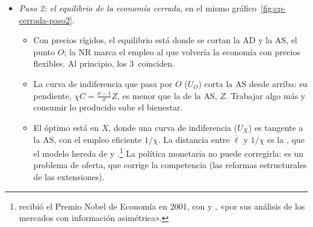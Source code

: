 \documentclass[11pt]{article}
\begin{document}
\begin{itemize}
\item \emph{Paso 2: el equilibrio de la economía cerrada}, en el mismo gráfico~\ref{fig:cp-cerrada-paso2}.
  \begin{itemize}
  \item Con precios rígidos, el equilibrio está donde se cortan la AD y la AS, el punto $O$; la NR marca el empleo al que volvería la economía con precios flexibles. Al principio, los 3~coinciden.
  \item La curva de indiferencia que pasa por $O$ ($U_O$) corta la AS desde arriba: su pendiente, $\chi C=\frac{\sigma-1}{\sigma}Z$, es menor que la de la AS, $Z$. Trabajar algo más y consumir lo producido sube el bienestar.
  \item El óptimo está en $X$, donde una curva de indiferencia ($U_X$) es tangente a la AS, con el empleo eficiente $1/\chi$. La distancia entre $\overline{\ell}$ y $1/\chi$ es la , que el modelo hereda de  y .\footnote{ recibió el Premio Nobel de Economía en 2001, con  y , «por sus análisis de los mercados con información asimétrica»\nocite{Nobel2001AkerlofSpenceStiglitz}.} La política monetaria no puede corregirla: es un problema de oferta, que corrige la competencia (las reformas estructurales de las extensiones).
  \end{itemize}
\end{itemize}
\end{document}
